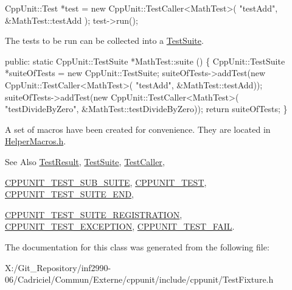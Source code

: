 \begin{DoxyCode}
CppUnit::Test *test = \textcolor{keyword}{new} CppUnit::TestCaller<MathTest>( \textcolor{stringliteral}{"testAdd"}, 
                                                         &MathTest::testAdd );
test->run();
\end{DoxyCode}


The tests to be run can be collected into a \hyperlink{class_test_suite}{Test\-Suite}.


\begin{DoxyCode}
\textcolor{keyword}{public}: 
  \textcolor{keyword}{static} CppUnit::TestSuite *MathTest::suite () \{
     CppUnit::TestSuite *suiteOfTests = \textcolor{keyword}{new} CppUnit::TestSuite;
     suiteOfTests->addTest(\textcolor{keyword}{new} CppUnit::TestCaller<MathTest>(
                             \textcolor{stringliteral}{"testAdd"}, &MathTest::testAdd));
     suiteOfTests->addTest(\textcolor{keyword}{new} CppUnit::TestCaller<MathTest>(
                             \textcolor{stringliteral}{"testDivideByZero"}, &MathTest::testDivideByZero));
     \textcolor{keywordflow}{return} suiteOfTests;
 \}
\end{DoxyCode}


A set of macros have been created for convenience. They are located in \hyperlink{_helper_macros_8h}{Helper\-Macros.\-h}.

\begin{DoxySeeAlso}{See Also}
\hyperlink{class_test_result}{Test\-Result}, \hyperlink{class_test_suite}{Test\-Suite}, \hyperlink{class_test_caller}{Test\-Caller}, 

\hyperlink{group___writing_test_fixture_gae19f30ade82172cf6c3ff297367a10c2}{C\-P\-P\-U\-N\-I\-T\-\_\-\-T\-E\-S\-T\-\_\-\-S\-U\-B\-\_\-\-S\-U\-I\-T\-E}, \hyperlink{group___writing_test_fixture_gaac9b03d898b207e1daf2f93867935a96}{C\-P\-P\-U\-N\-I\-T\-\_\-\-T\-E\-S\-T}, \hyperlink{group___writing_test_fixture_ga601b2e1d525f3947b216e28c625abcb1}{C\-P\-P\-U\-N\-I\-T\-\_\-\-T\-E\-S\-T\-\_\-\-S\-U\-I\-T\-E\-\_\-\-E\-N\-D}, 

\hyperlink{_helper_macros_8h_a2f4071eec88d1e306665ada0f2dd80e4}{C\-P\-P\-U\-N\-I\-T\-\_\-\-T\-E\-S\-T\-\_\-\-S\-U\-I\-T\-E\-\_\-\-R\-E\-G\-I\-S\-T\-R\-A\-T\-I\-O\-N}, \hyperlink{group___writing_test_fixture_gaca8eeb6f60714baade6cbfd185868c40}{C\-P\-P\-U\-N\-I\-T\-\_\-\-T\-E\-S\-T\-\_\-\-E\-X\-C\-E\-P\-T\-I\-O\-N}, \hyperlink{group___writing_test_fixture_ga5bdaf0444216a8f93ead13d5ae964d7e}{C\-P\-P\-U\-N\-I\-T\-\_\-\-T\-E\-S\-T\-\_\-\-F\-A\-I\-L}. 
\end{DoxySeeAlso}


The documentation for this class was generated from the following file\-:\begin{DoxyCompactItemize}
\item 
X\-:/\-Git\-\_\-\-Repository/inf2990-\/06/\-Cadriciel/\-Commun/\-Externe/cppunit/include/cppunit/Test\-Fixture.\-h\end{DoxyCompactItemize}
